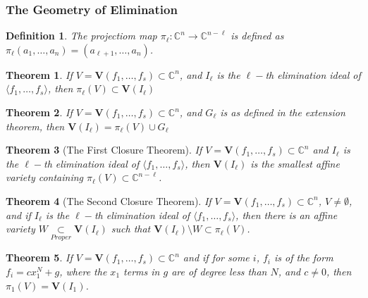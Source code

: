 \documentclass[oneside]{book}
\theoremstyle{mystyle}
\newtheorem{theorem}{Theorem}[section]
\newtheorem{definition}{Definition}[section]
\begin{document}
\subsubsection{The Geometry of Elimination}
\begin{definition}
The projectiom map $\pi_{\ell}: \mathbb{C}^n \rightarrow \mathbb{C}^{n-\ell}$ is defined as $\pi_{\ell}(a_1,\hdots, a_n) = (a_{\ell+1},\hdots, a_n)$.
\end{definition}
\begin{theorem}
If $V=\mathbf{V}(f_1,\hdots, f_s) \subset \mathbb{C}^n$, and $I_{\ell}$ is the $\ell-$th elimination ideal of $\langle f_1,\hdots, f_s\rangle$, then $\pi_{\ell}(V) \subset \textbf{V}(I_{\ell})$
\end{theorem}
\begin{theorem}
If $V = \mathbf{V}(f_1,\hdots, f_s) \subset \mathbb{C}^n$, and $G_{\ell}$ is as defined in the extension theorem, then $\textbf{V}(I_{\ell}) = \pi_{\ell}(V)\cup G_{\ell}$
\end{theorem}
\begin{theorem}[The First Closure Theorem]
If $V = \mathbf{V}(f_1,\hdots, f_s) \subset \mathbb{C}^n$ and $I_{\ell}$ is the $\ell-$th elimination ideal of $\langle f_1,\hdots, f_s\rangle$, then $\textbf{V}(I_{\ell})$ is the smallest affine variety containing $\pi_{\ell}(V)\subset \mathbb{C}^{n-\ell}$.
\end{theorem}
\begin{theorem}[The Second Closure Theorem]
If $V = \mathbf{V}(f_1,\hdots, f_s) \subset \mathbb{C}^n$, $V\ne \emptyset$, and if $I_{\ell}$ is the $\ell-$th elimination ideal of $\langle f_1,\hdots, f_s\rangle$, then there is an affine variety $W\underset{Proper}{\subset} \textbf{V}(I_{\ell})$ such that $\textbf{V}(I_{\ell})\setminus W \subset \pi_{\ell}(V)$.
\end{theorem}
\begin{theorem}
If $V = \mathbf{V}(f_1,\hdots, f_s)\subset \mathbb{C}^n$ and if for some $i$, $f_i$ is of the form $f_i = cx_1^N + g$, where the $x_1$ terms in $g$ are of degree less than $N$, and $c\ne 0$, then $\pi_{1}(V) = \textbf{V}(I_{1})$.
\end{theorem}
\end{document}
